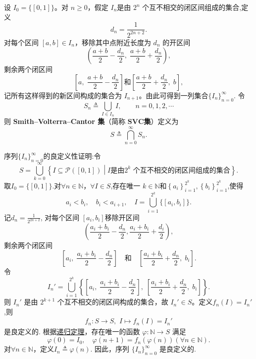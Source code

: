 \documentclass[../../main.tex]{subfiles}%
\begin{document}
\begin{definition}\label{definition:Smith-Volterra-Cantor集(SVC集)}
设 \( I_0 = \{[0,1]\} \)。对 \( n \geqslant 0 \)，假定 \( I_n \)是由 \( 2^n \) 个互不相交的闭区间组成的集合,定义
\[
d_n = \frac{1}{2^{2n+2}}.
\]
对每个区间 \([a,b] \in I_n\)，移除其中点附近长度为 \( d_n \) 的开区间
\[
\left( \frac{a+b}{2} - \frac{d_n}{2},\; \frac{a+b}{2} + \frac{d_n}{2} \right),
\]
剩余两个闭区间
\[
\left[ a,\; \frac{a+b}{2} - \frac{d_n}{2} \right]\text{和}\left[ \frac{a+b}{2} + \frac{d_n}{2},\; b \right],
\]
记所有这样得到的新区间构成的集合为 \( I_{n+1} \)。由此可得到一列集合$\{I_n\}_{n=0}^{\infty}$.
令
\[
S_n \triangleq \bigcup_{I \in I_n} I, \qquad n = 0,1,2,\cdots
\]
则 \textbf{Smith–Volterra–Cantor 集}（简称 $\mathbf{SVC}$\textbf{集}）定义为
\[
S \triangleq \bigcap_{n=0}^{\infty} S_n  .
\]
\end{definition}
\begin{remark}
序列\(\{I_n\}_{n=0}^{\infty}\)的良定义性证明:令
\[
S = \bigcup_{k=0}^{\infty} \left\{ I \subseteq \mathcal{P}([0,1])  \middle| I \text{是由} 2^k \text{ 个互不相交的闭区间组成的集合} \right\}.
\]
取$I_0=\{[0,1]\}$.对\(\forall n \in \mathbb{N}\)，\(\forall I \in S\),存在唯一 \(k\in \mathbb{N}\)和$\left\{ a_i \right\} _{i=1}^{2^k},\left\{ b_i \right\} _{i=1}^{2^k}$,使得
\[
a_i<b_i,\quad b_i<a_{i+1},\quad I=\bigcup_{i=1}^{2^k}{\{\left[ a_i,b_i \right]\}}.
\]
记$d_n = \frac{1}{2^{2n+2}}$,
对每个区间 \([a_i, b_i]\)移除开区间
\[
\left( \frac{a_i+b_i}{2}-\frac{d_n}{2},\frac{a_i+b_i}{2}+\frac{d_i}{2} \right) ,
\]
剩余两个闭区间
\[
\left[ a_i,\;\frac{a_i+b_i}{2}-\frac{d_n}{2} \right] \quad \text{和}\quad \left[ \frac{a_i+b_i}{2}+\frac{d_n}{2},\;b_i \right] .
\]
令
\[
I_n' =\bigcup_{i=1}^{2^k}{\left\{ \left[ a_i,\;\frac{a_i+b_i}{2}-\frac{d_n}{2} \right] ,\;\left[ \frac{a_i+b_i}{2}+\frac{d_n}{2},\;b_i \right] \right\}}.
\]
则 \(I_n'\) 是由 \(2^{k+1}\) 个互不相交的闭区间构成的集合，故 \(I_n' \in S\)。定义$f_n(I) = I_n'$,则
\begin{align*}
f_n:S\to S,\,\,I\mapsto f_n(I)=I_n'
\end{align*}
是良定义的.
根据\hyperref[Set Theory-theorem:逆归定理]{递归定理}，存在唯一的函数 \(\varphi : \mathbb{N} \to S\) 满足
\[
\varphi(0) = I_0,\quad \varphi(n+1) = f_n(\varphi(n))(\forall n \in \mathbb{N}).
\]
对\(\forall n \in \mathbb{N}\)，定义$I_n \triangleq \varphi(n).$
因此，序列 \(\{I_n\}_{n=0}^{\infty}\) 是良定义的.
\end{remark}
\end{document}
